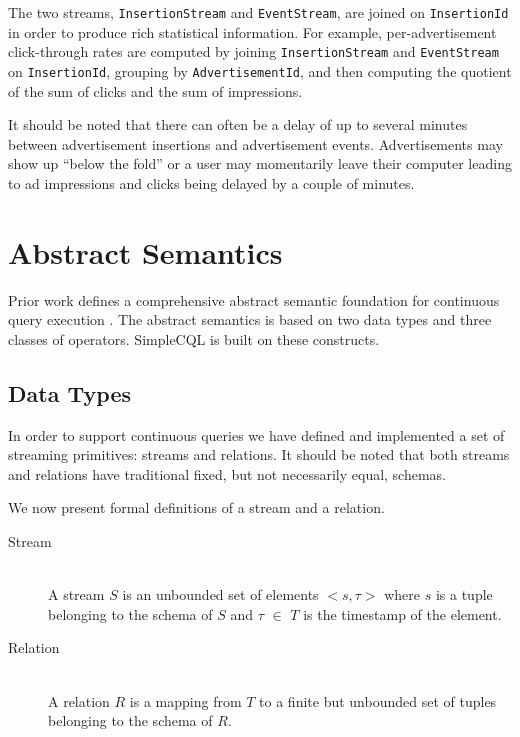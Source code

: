 \documentclass[a4paper, 10pt, conference]{IEEEconf}
\begin{document}
The two streams, \texttt{InsertionStream} and \texttt{EventStream}, are joined on \texttt{InsertionId} in order to produce rich statistical information.  For example, per-advertisement click-through rates are computed by joining \texttt{InsertionStream} and \texttt{EventStream} on \texttt{InsertionId}, grouping by \texttt{AdvertisementId}, and then computing the quotient of the sum of clicks and the sum of impressions.

It should be noted that there can often be a delay of up to several minutes between advertisement insertions and advertisement events.  Advertisements may show up ``below the fold'' or a user may momentarily leave their computer leading to ad impressions and clicks being delayed by a couple of minutes.

\section{Abstract Semantics}
Prior work defines a comprehensive abstract semantic foundation for continuous query execution \cite{cql}.  The abstract semantics is based on two data types and three classes of operators.  SimpleCQL is built on these constructs.

\subsection{Data Types}
In order to support continuous queries we have defined and implemented a set of streaming primitives: streams and relations. It should be noted that both streams and relations have traditional fixed, but not necessarily equal, schemas.

We now present formal definitions of a stream and a relation.

\begin{description}
  \item[Stream] \hfill \\
  A stream $S$ is an unbounded set of elements $<s, \tau>$ where $s$ is a tuple belonging to the schema of $S$ and $\tau$ $\in$ $T$ is the timestamp of the element.
  
  \item[Relation] \hfill \\
  A relation $R$ is a mapping from $T$ to a finite but unbounded set of tuples belonging to the schema of $R$.
\end{description}
\end{document}
